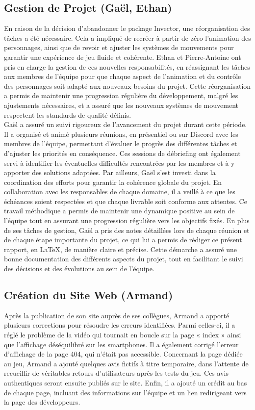 \documentclass{report}
\begin{document}
\subsection*{Gestion de Projet (Gaël, Ethan)}
En raison de la décision d'abandonner le package Invector, une réorganisation des tâches a été nécessaire. Cela a impliqué de recréer à partir de zéro l'animation des personnages, ainsi que de revoir et ajuster les systèmes de mouvements pour garantir une expérience de jeu fluide et cohérente. Ethan et Pierre-Antoine ont pris en charge la gestion de ces nouvelles responsabilités, en réassignant les tâches aux membres de l'équipe pour que chaque aspect de l'animation et du contrôle des personnages soit adapté aux nouveaux besoins du projet. Cette réorganisation a permis de maintenir une progression régulière du développement, malgré les ajustements nécessaires, et a assuré que les nouveaux systèmes de mouvement respectent les standards de qualité définis.
\\[0.4cm]
Gaël a assuré un suivi rigoureux de l’avancement du projet durant cette période. Il a organisé et animé plusieurs réunions, en présentiel ou sur Discord avec les membres de l'équipe, permettant d’évaluer le progrès des différentes tâches et d’ajuster les priorités en conséquence. Ces sessions de débriefing ont également servi à identifier les éventuelles difficultés rencontrées par les membres et à y apporter des solutions adaptées. Par ailleurs, Gaël s’est investi dans la coordination des efforts pour garantir la cohérence globale du projet. En collaboration avec les responsables de chaque domaine, il a veillé à ce que les échéances soient respectées et que chaque livrable soit conforme aux attentes. Ce travail méthodique a permis de maintenir une dynamique positive au sein de l’équipe tout en assurant une progression régulière vers les objectifs fixés. En plus de ses tâches de gestion, Gaël a pris des notes détaillées lors de chaque réunion et de chaque étape importante du projet, ce qui lui a permis de rédiger ce présent rapport, en \LaTeX, de manière claire et précise. Cette démarche a assuré une bonne documentation des différents aspects du projet, tout en facilitant le suivi des décisions et des évolutions au sein de l’équipe.


\subsection*{Création du Site Web (Armand)}
Après la publication de son site auprès de ses collègues, Armand a apporté plusieurs corrections pour résoudre les erreurs identifiées. Parmi celles-ci, il a réglé le problème de la vidéo qui tournait en boucle sur la page « index » ainsi que l'affichage déséquilibré sur les smartphones. Il a également corrigé l'erreur d'affichage de la page 404, qui n'était pas accessible. Concernant la page dédiée au jeu, Armand a ajouté quelques avis fictifs à titre temporaire, dans l’attente de recueillir de véritables retours d’utilisateurs après les tests du jeu. Ces avis authentiques seront ensuite publiés sur le site. Enfin, il a ajouté un crédit au bas de chaque page, incluant des informations sur l’équipe et un lien redirigeant vers la page des développeurs.
\end{document}
